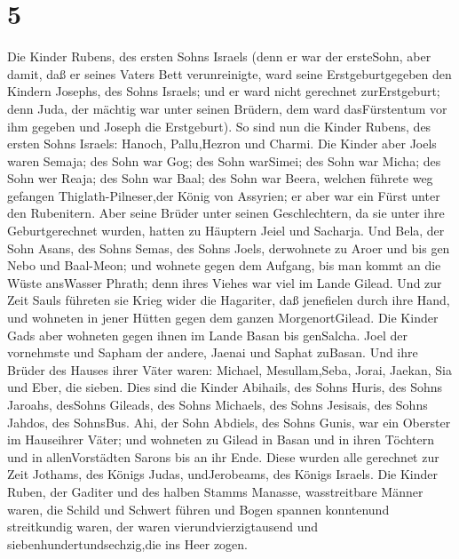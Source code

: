 \hypertarget{section-4}{%
\section{5}\label{section-4}}

 Die Kinder Rubens, des ersten Sohns Israels (denn er war
der ersteSohn, aber damit, daß er seines Vaters Bett verunreinigte, ward
seine Erstgeburtgegeben den Kindern Josephs, des Sohns Israels; und er
ward nicht gerechnet zurErstgeburt;  denn Juda, der mächtig
war unter seinen Brüdern, dem ward dasFürstentum vor ihm gegeben und
Joseph die Erstgeburt).  So sind nun die Kinder Rubens, des
ersten Sohns Israels: Hanoch, Pallu,Hezron und Charmi.  Die
Kinder aber Joels waren Semaja; des Sohn war Gog; des Sohn warSimei;
 des Sohn war Micha; des Sohn wer Reaja; des Sohn war Baal;
 des Sohn war Beera, welchen führete weg gefangen
Thiglath-Pilneser,der König von Assyrien; er aber war ein Fürst unter
den Rubenitern.  Aber seine Brüder unter seinen
Geschlechtern, da sie unter ihre Geburtgerechnet wurden, hatten zu
Häuptern Jeiel und Sacharja.  Und Bela, der Sohn Asans, des
Sohns Semas, des Sohns Joels, derwohnete zu Aroer und bis gen Nebo und
Baal-Meon;  und wohnete gegen dem Aufgang, bis man kommt an
die Wüste ansWasser Phrath; denn ihres Viehes war viel im Lande Gilead.
 Und zur Zeit Sauls führeten sie Krieg wider die Hagariter,
daß jenefielen durch ihre Hand, und wohneten in jener Hütten gegen dem
ganzen MorgenortGilead.  Die Kinder Gads aber wohneten
gegen ihnen im Lande Basan bis genSalcha.  Joel der
vornehmste und Sapham der andere, Jaenai und Saphat zuBasan.
 Und ihre Brüder des Hauses ihrer Väter waren: Michael,
Mesullam,Seba, Jorai, Jaekan, Sia und Eber, die sieben. 
Dies sind die Kinder Abihails, des Sohns Huris, des Sohns Jaroahs,
desSohns Gileads, des Sohns Michaels, des Sohns Jesisais, des Sohns
Jahdos, des SohnsBus.  Ahi, der Sohn Abdiels, des Sohns
Gunis, war ein Oberster im Hauseihrer Väter;  und wohneten
zu Gilead in Basan und in ihren Töchtern und in allenVorstädten Sarons
bis an ihr Ende.  Diese wurden alle gerechnet zur Zeit
Jothams, des Königs Judas, undJerobeams, des Königs Israels.
 Die Kinder Ruben, der Gaditer und des halben Stamms
Manasse, wasstreitbare Männer waren, die Schild und Schwert führen und
Bogen spannen konntenund streitkundig waren, der waren
vierundvierzigtausend und siebenhundertundsechzig,die ins Heer zogen.
